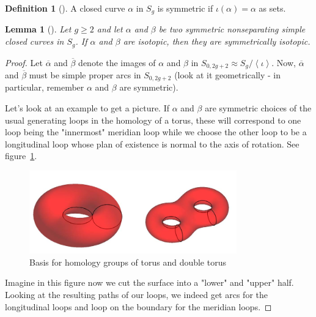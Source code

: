 \documentclass[reqno]{amsart}
\newtheorem{lemma}[theorem]{Lemma}
\theoremstyle{definition}
\newtheorem{definition}[theorem]{Definition}
\theoremstyle{remark}
\begin{document}
   \begin{definition}[]
       A closed curve $\alpha$ in $S_g$ is symmetric
       if $\iota \left( \alpha \right) = \alpha$ as sets.
   \end{definition}

   \begin{lemma}[]\label{loops-isotopic-iff-symmetrically-isotopic}
       Let $g \ge 2$ and let $\alpha$ and $\beta$ be
       two symmetric nonseparating simple closed
       curves in $S_g$. If $\alpha$ and $\beta$ are isotopic,
       then they are symmetrically isotopic.
   \end{lemma}

   \begin{proof}
       Let $\overline{\alpha}$ and $\overline{\beta}$ 
       denote the images of $\alpha$ and $\beta$ 
       in $S_{0,2g+2}\approx S_g / \left<\iota \right>$.
       Now,
       $ \overline{\alpha}$ and $ \overline{\beta}$
       must be simple proper arcs in $S_{0,2g+2}$ (look
       at it geometrically - in particular, remember $\alpha$ and
       $\beta$ are symmetric).

       Let's look at an example to get a picture. If
       $\alpha$ and $\beta$ are symmetric choices of the
       usual generating loops in the homology of a torus, these
       will correspond to one loop being the
       "innermost" meridian loop while we choose the
       other loop to be a longitudinal loop
       whose plan of existence is
       normal to the axis of rotation. See
       figure~\ref{fig:homology-basis-of-torus-and-double-torus-png}.

       \begin{figure}[htpb]
           \centering
           \includegraphics[width=0.8\textwidth]{homology-basis-of-torus-and-double-torus.png}
           \caption{Basis for homology groups of torus and
           double torus}
           \label{fig:homology-basis-of-torus-and-double-torus-png}
       \end{figure}
       Imagine in this figure now we cut the surface into a "lower"
       and "upper" half. Looking at the resulting paths of
       our loops, we indeed get arcs for the longitudinal loops
       and loop on the boundary for the meridian loops.





\end{proof}
\end{document}
